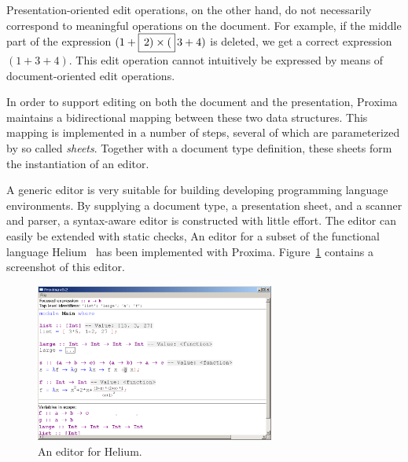 \documentclass[12pt]{article}
\begin{document}
Presentation-oriented edit operations, on the other hand, do not necessarily correspond to meaningful operations on the document. For example, if the middle part of the expression $(1+\framebox{$\,2) \times ($}\,3+4)$ is deleted, we get a correct expression $(1+3+4)$. This edit operation cannot intuitively be expressed by means of document-oriented edit operations.


In order to support editing on both the document and the presentation, Proxima maintains a bidirectional mapping between these two data structures. This mapping is implemented in a number of steps, several of which are parameterized by so called {\em sheets}. Together with a document type definition, these sheets form the instantiation of an editor.


A generic editor is very suitable for building developing programming language environments. By supplying a document type, a presentation sheet, and a scanner and parser, a syntax-aware editor is constructed with little effort. The editor can easily be extended with static checks,
An editor for a subset of the functional language Helium~\cite{heeren03helium} has been implemented with Proxima. Figure~\ref{fig:heliumEditor} contains a screenshot of this editor. 


\begin{figure}[ht]
\centering
\includegraphics[width=0.7\textwidth]{images/HeliumEditor}
\caption{An editor for Helium.}
\label{fig:heliumEditor}
\end{figure}
\end{document}
